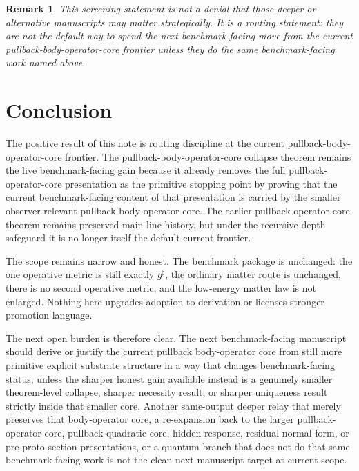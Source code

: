 \documentclass[11pt]{article}
\newcommand{\CompletedMetric}{g^{\sharp}}
\newtheorem{remark}{Remark}
\begin{document}
\begin{remark}
This screening statement is not a denial that those deeper or alternative manuscripts may matter strategically. It is a routing statement: they are not the default way to spend the next benchmark-facing move from the current pullback-body-operator-core frontier unless they do the same benchmark-facing work named above.
\end{remark}

\section{Conclusion}

The positive result of this note is routing discipline at the current pullback-body-operator-core frontier. The pullback-body-operator-core collapse theorem remains the live benchmark-facing gain because it already removes the full pullback-operator-core presentation as the primitive stopping point by proving that the current benchmark-facing content of that presentation is carried by the smaller observer-relevant pullback body-operator core. The earlier pullback-operator-core theorem remains preserved main-line history, but under the recursive-depth safeguard it is no longer itself the default current frontier.

The scope remains narrow and honest. The benchmark package is unchanged: the one operative metric is still exactly \(\CompletedMetric\), the ordinary matter route is unchanged, there is no second operative metric, and the low-energy matter law is not enlarged. Nothing here upgrades adoption to derivation or licenses stronger promotion language.

The next open burden is therefore clear. The next benchmark-facing manuscript should derive or justify the current pullback body-operator core from still more primitive explicit substrate structure in a way that changes benchmark-facing status, unless the sharper honest gain available instead is a genuinely smaller theorem-level collapse, sharper necessity result, or sharper uniqueness result strictly inside that smaller core. Another same-output deeper relay that merely preserves that body-operator core, a re-expansion back to the larger pullback-operator-core, pullback-quadratic-core, hidden-response, residual-normal-form, or pre-proto-section presentations, or a quantum branch that does not do that same benchmark-facing work is not the clean next manuscript target at current scope.
\end{document}
